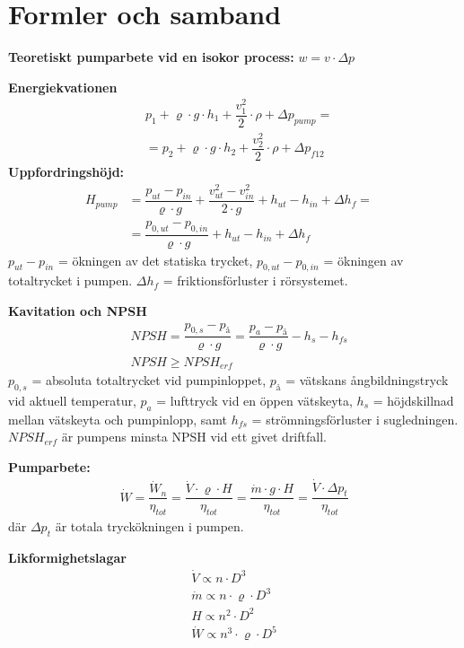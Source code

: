 \section*{Formler och samband}
	\textbf{Teoretiskt pumparbete vid en isokor process: } $w=v \cdot \Delta p$ \par
\textbf{Energiekvationen }  
	\begin{align*}
    & p_1 + \varrho \cdot g \cdot h_1 + \dfrac{v_1^2}{2} \cdot \rho +  \Delta p_{pump} = \\ 
    & = p_2 + \varrho \cdot g \cdot h_2 + \dfrac{v_2^2}{2} \cdot \rho +  \Delta p_{f12} 
	\end{align*}
\textbf{Uppfordringshöjd:} 
	\begin{align*}
    H_{pump} & = \dfrac{p_{ut}-p_{in}}{\varrho \cdot g}+\dfrac{v^2_{ut}-v^2_{in}}{2\cdot g}+h_{ut}-h_{in} + \Delta h_f = &\\
    & = \dfrac{p_{0,ut}-p_{0,in}}{\varrho \cdot g}+h_{ut}-h_{in} + \Delta h_f  
	\end{align*}
$p_{ut}-p_{in}$ = ökningen av det statiska trycket, $p_{0,ut}-p_{0,in}$ = ökningen av totaltrycket i pumpen. $\Delta h_f$ = friktionsförluster i rörsystemet. \par
\textbf{Kavitation och NPSH}
 \begin{align*}
	& \textit{NPSH} = \dfrac{p_{0,s} - p_\text{å}}{\varrho \cdot g} = \dfrac{p_a - p_\text{å}}{\varrho \cdot g} - h_s - h_{fs} \\
	&	\textit{NPSH} \geq \textit{NPSH}_{erf}
 \end{align*}
$p_{0,s}$ = absoluta totaltrycket vid pumpinloppet, $p_\text{å}$ = vätskans ångbildningstryck vid aktuell temperatur, $p_a$ = lufttryck vid en öppen vätskeyta, $h_s$ = höjdskillnad mellan vätskeyta och pumpinlopp, samt $h_{fs}$ = strömningsförluster i sugledningen. $\textit{NPSH}_{erf}$ är pumpens minsta NPSH vid ett givet driftfall.\par
	\textbf{Pumparbete: }
	\begin{align*}
    & \dot{W} = \dfrac{\dot{W}_n}{\eta_{tot}} = \dfrac{\dot{V}\cdot\varrho\cdot{H}}{\eta_{tot}}= \dfrac{\dot{m}\cdot g \cdot H }{\eta_{tot}}=  
    \dfrac{\dot{V}\cdot\Delta p_t}{\eta_{tot}} & 
	\end{align*}
       där $ \Delta p_t $  är totala tryckökningen i pumpen. \par
	\textbf{Likformighetslagar } 
	\begin{align*}
  & \dot{V} \propto n \cdot D^3 & \\ 
	& \dot{m} \propto n \cdot \varrho \cdot  D^3 \\ 
  & H\propto n^2 \cdot D^2  \\
  & \dot{W}\propto n^3 \cdot \varrho \cdot D^5  
	\end{align*}
